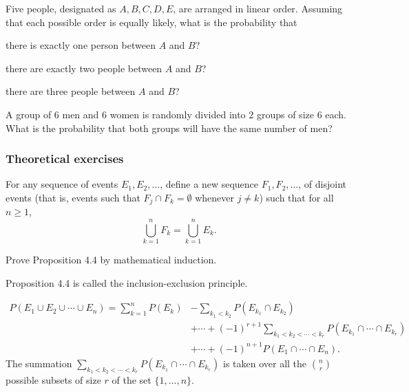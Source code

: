 \begin{problem}[Ross, \S 2, \# 44]
  Five people, designated as \(A,B,C,D,E\), are arranged in linear
  order. Assuming that each possible order is equally likely, what is the
  probability that
  \begin{alphlist}
  \item there is exactly one person between \(A\) and \(B\)?
  \item there are exactly two people between \(A\) and \(B\)?
  \item there are three people between \(A\) and \(B\)?
  \end{alphlist}
\end{problem}
\begin{solution*}
\end{solution*}

\begin{problem}[Ross, \S 2, \# 49]
  A group of \(6\) men and \(6\) women is randomly divided into \(2\)
  groups of size \(6\) each. What is the probability that both groups will
  have the same number of men?
\end{problem}
\begin{solution*}
\end{solution*}

\subsubsection{Theoretical exercises}
\begin{problem}[Ross, \S 2, \# 5]
  For any sequence of events \(E_1,E_2,\dotsc\), define a new sequence
  \(F_1,F_2,\dotsc\), of disjoint events (that is, events such that
  \(F_j\cap F_k=\emptyset\) whenever \(j\neq k\)) such that for all \(n\geq
  1\),
  \[
    \bigcup_{k=1}^n F_k=\bigcup_{k=1}^n E_k.
  \]
\end{problem}
\begin{solution*}
\end{solution*}

\begin{problem}[Ross, \S 2, \# 14]
  Prove Proposition 4.4 by mathematical induction.
\end{problem}
\begin{solution*}
  Proposition 4.4 is called the inclusion-exclusion principle.
  \begin{proposition*}
    \[
      \begin{split}
        P(E_1\cup E_2\cup\dotsb\cup E_n)
        =\sum_{k=1}^n P(E_k)&-\sum_{k_1<k_2} P(E_{k_1}\cap E_{k_2})\\
        &+\dotsb+(-1)^{r+1}\sum_{k_1<k_2<\dotsb<k_r}
        P(E_{k_1}\cap\dotsb\cap E_{k_r})\\
        &+\dotsb+(-1)^{n+1}P(E_1\cap\dotsb\cap E_n).
      \end{split}
    \]
    The summation
    \(\sum_{k_1<k_2<\dotsb<k_r}P(E_{k_1}\cap\dotsb\cap E_{k_r})\) is taken
    over all the \(\binom{n}{r}\) possible subsets of size \(r\) of the set
    \(\{1,\dotsc,n\}\).
  \end{proposition*}
\end{solution*}


